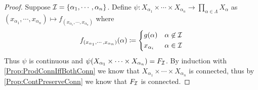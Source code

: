 \documentclass[screen,single]{techreport}
\numberwithin{equation}{section}
\begin{document}
\begin{proof}
	Suppose $\mathcal{I} = \{ \alpha_1,\cdots,\alpha_n\}$.
	Define $\psi : X_{\alpha_1} \times \cdots \times X_{\alpha_n} \to \prod_{\alpha \in \Lambda} X_\alpha$ as $(x_{\alpha_1},\cdots,x_{\alpha_n}) \mapsto f_{(x_{\alpha_1},\cdots,x_{\alpha_n})}$ where
	\[
	f_{(x_{\alpha_1},\cdots,x_{\alpha_n})}(\alpha) \coloneqq \begin{dcases}
 		g(\alpha) & \alpha \not\in \mathcal{I} \\
 		x_{\alpha_i} & \alpha \in \mathcal{I}
 	\end{dcases}
	\]
	Thus $\psi$ is continuous and $\psi(X_{\alpha_1} \times \cdots \times X_{\alpha_n}) = F_{\mathcal{I}}$.
	By induction with \cref{Prop:ProdConnIffBothConn} we know that $X_{\alpha_1} \times \cdots \times X_{\alpha_n}$ is connected, thus by \cref{Prop:ContPreserveConn} we know that $F_{\mathcal{I}}$ is connected.
\end{proof}
\end{document}
